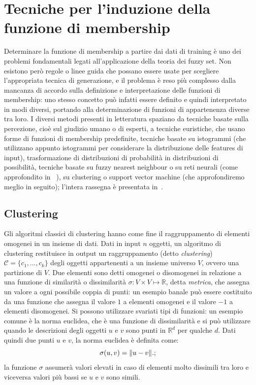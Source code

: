 \documentclass[oneside, openany]{book}
\DeclarePairedDelimiter{\norma}{\lVert}{\rVert}
\begin{document}
		\chapter[Induzione della funzione di membership]{Tecniche per l'induzione della funzione di membership}
		Determinare la funzione di membership a partire dai dati di training è uno dei problemi fondamentali legati all'applicazione della teoria dei fuzzy set. Non esistono però regole o linee guida che possano essere usate per scegliere l'appropriata tecnica di generazione, e il problema è reso più complesso dalla mancanza di accordo sulla definizione e interpretazione delle funzioni di membership: uno stesso concetto può infatti essere definito e quindi interpretato in modi diversi, portando alla determinazione di funzioni di appartenenza diverse tra loro. I diversi metodi presenti in letteratura spaziano da tecniche basate sulla percezione, cioè sul giudizio umano o di esperti, a tecniche euristiche, che usano forme di funzioni di membership predefinite, tecniche basate su istogrammi (che utilizzano appunto istogrammi per considerare la distribuzione delle features di input), trasformazione di distribuzioni di probabilità in distribuzioni di possibilità, tecniche basate su fuzzy nearest neighbour o su reti neurali (come approfondito in ~\cite{bib:rita}), su clustering o support vector machine (che approfondiremo meglio in seguito); l'intera rassegna è presentata in~\cite{bib:rassegna}.
		
		\section{Clustering}
		Gli algoritmi classici di clustering hanno come fine il raggruppamento di elementi omogenei in un insieme di dati. Dati in input $n$ oggetti, un algoritmo di clustering restituisce in output un raggruppamento (detto \textit{clustering}) $\mathcal{C}=\{c_1, ..., c_k\}$ degli oggetti appartenenti a un insieme universo $V$, ovvero una partizione di $V$. Due elementi sono detti omogenei o disomogenei in relazione a una funzione di similarità o dissimilarità $\sigma: V\times V\mapsto \mathbb{R}$, detta \textit{metrica}, che assegna un valore a ogni possibile coppia di punti: un esempio banale può essere costituito da una funzione che assegna il valore $1$ a elementi omogenei e il valore $-1$ a elementi disomogenei. Si possono utilizzare svariati tipi di funzioni: un esempio comune è la norma euclidea, che è una funzione di dissimilarità e si può utilizzare quando le descrizioni degli oggetti $u$ e $v$ sono punti in $\mathbb R^d$ per qualche $d$. Dati quindi due punti $u$ e $v$, la norma euclidea è definita come:
		\[
			\sigma(u, v) = \norma{u - v}\text{.}\text{;}
		\]
		la funzione $\sigma$ assumerà valori elevati in caso di elementi molto dissimili tra loro e viceversa valori più bassi se $u$ e $v$ sono simili.
		
\end{document}
